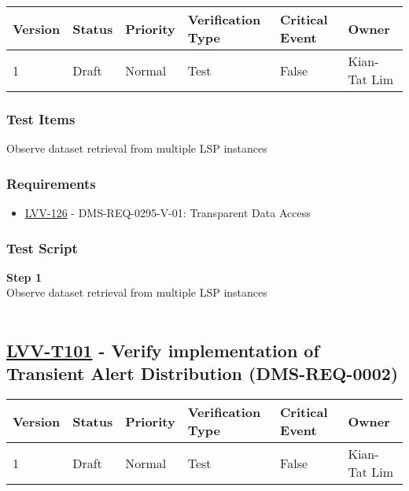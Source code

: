 \begin{longtable}[]{@{}llllll@{}}
\toprule
Version & Status & Priority & Verification Type & Critical Event &
Owner\tabularnewline
\midrule
\endhead
1 & Draft & Normal & Test & False & Kian-Tat Lim\tabularnewline
\bottomrule
\end{longtable}

\hypertarget{test-items-76}{%
\subsubsection{Test Items}\label{test-items-76}}

Observe dataset retrieval from multiple LSP instances

\hypertarget{requirements-77}{%
\subsubsection{Requirements}\label{requirements-77}}

\begin{itemize}
\tightlist
\item
  \href{https://jira.lsstcorp.org/browse/LVV-126}{LVV-126} -
  DMS-REQ-0295-V-01: Transparent Data Access
\end{itemize}

\hypertarget{test-script-77}{%
\subsubsection{Test Script}\label{test-script-77}}

\textbf{Step 1}\\
Observe dataset retrieval from multiple LSP instances\\
~\\

\hypertarget{lvv-t101---verify-implementation-of-transient-alert-distribution-dms-req-0002}{%
\subsection{\texorpdfstring{\href{https://jira.lsstcorp.org/secure/Tests.jspa\#/testCase/LVV-T101}{LVV-T101}
- Verify implementation of Transient Alert Distribution
(DMS-REQ-0002)}{LVV-T101 - Verify implementation of Transient Alert Distribution (DMS-REQ-0002)}}\label{lvv-t101---verify-implementation-of-transient-alert-distribution-dms-req-0002}}

\begin{longtable}[]{@{}llllll@{}}
\toprule
Version & Status & Priority & Verification Type & Critical Event &
Owner\tabularnewline
\midrule
\endhead
1 & Draft & Normal & Test & False & Kian-Tat Lim\tabularnewline
\bottomrule
\end{longtable}

